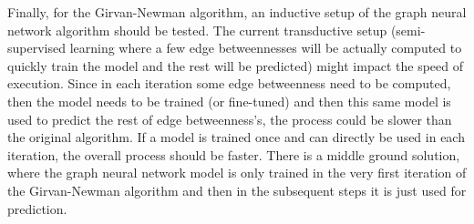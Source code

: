 Finally, for the Girvan-Newman algorithm, an inductive setup of the graph neural network algorithm should be tested.  The current transductive setup (semi-supervised learning where a few edge betweennesses will be actually computed to quickly train the model and the rest will be predicted) might impact the speed of execution. Since in each iteration some edge betweenness need to be computed, then the model needs to be trained (or fine-tuned) and then this same model is used to predict the rest of edge betweenness's, the process could be slower than the original algorithm. If a model is trained once and can directly be used in each iteration, the overall process should be faster. There is a middle ground solution, where the graph neural network model is only trained in the very first iteration of the Girvan-Newman algorithm and then in the subsequent steps it is just used for prediction. 








